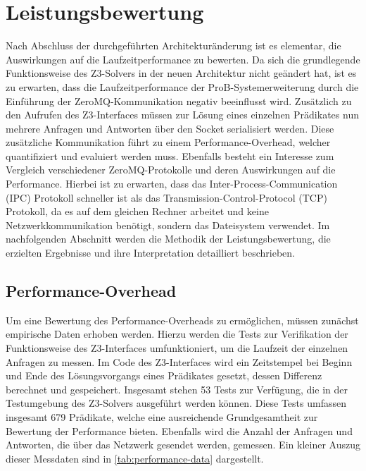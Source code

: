
\clearpage

\section{Leistungsbewertung}

Nach Abschluss der durchgeführten Architekturänderung ist es elementar, die Auswirkungen auf die Laufzeitperformance zu bewerten.
Da sich die grundlegende Funktionsweise des Z3-Solvers in der neuen Architektur nicht geändert hat,
ist es zu erwarten, dass die Laufzeitperformance der ProB-Systemerweiterung durch die Einführung der ZeroMQ-Kommunikation negativ beeinflusst wird.
Zusätzlich zu den Aufrufen des Z3-Interfaces müssen zur Lösung eines einzelnen Prädikates nun mehrere Anfragen und Antworten über den Socket serialisiert werden.
Diese zusätzliche Kommunikation führt zu einem Performance-Overhead, welcher quantifiziert und evaluiert werden muss.
Ebenfalls besteht ein Interesse zum Vergleich verschiedener ZeroMQ-Protokolle und deren Auswirkungen auf die Performance.
Hierbei ist zu erwarten, dass das Inter-Process-Communication (IPC) Protokoll schneller ist als das Transmission-Control-Protocol (TCP) Protokoll,
da es auf dem gleichen Rechner arbeitet und keine Netzwerkkommunikation benötigt, sondern das Dateisystem verwendet.
Im nachfolgenden Abschnitt werden die Methodik der Leistungsbewertung,
die erzielten Ergebnisse und ihre Interpretation detailliert beschrieben.

\subsection{Performance-Overhead}

Um eine Bewertung des Performance-Overheads zu ermöglichen, müssen zunächst empirische Daten erhoben werden.
Hierzu werden die Tests zur Verifikation der Funktionsweise des Z3-Interfaces umfunktioniert, um die Laufzeit der einzelnen Anfragen zu messen.
Im Code des Z3-Interfaces wird ein Zeitstempel bei Beginn und Ende des Lösungsvorgangs eines Prädikates gesetzt, dessen Differenz berechnet und gespeichert.
Insgesamt stehen 53 Tests zur Verfügung, die in der Testumgebung des Z3-Solvers ausgeführt werden können.
Diese Tests umfassen insgesamt 679 Prädikate, welche eine ausreichende Grundgesamtheit zur Bewertung der Performance bieten.
Ebenfalls wird die Anzahl der Anfragen und Antworten, die über das Netzwerk gesendet werden, gemessen.
Ein kleiner Auszug dieser Messdaten sind in \cref{tab:performance-data} dargestellt.


